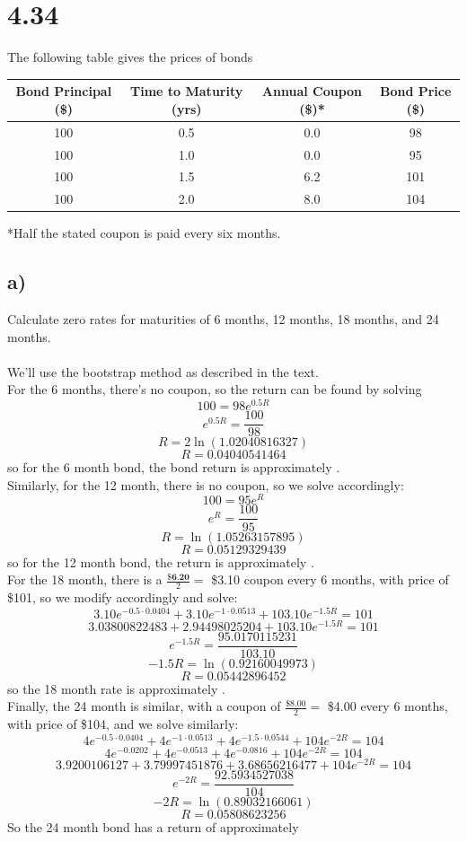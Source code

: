 \documentclass{article}
\begin{document}
{\Large 

\section*{4.34}

The following table gives the prices of bonds
\begin{center}
\begin{tabular}{ |c|c|c|c| } 
 \hline
 Bond Principal (\$) & Time to Maturity (yrs) & Annual Coupon (\$)* & Bond Price (\$) \\ 
 \hline
 100 & 0.5 & 0.0 & 98 \\ 
 \hline
 100 & 1.0 & 0.0 & 95 \\ 
 \hline
 100 & 1.5 & 6.2 & 101 \\ 
 \hline
 100 & 2.0 & 8.0 & 104 \\ 
 \hline
\end{tabular}
\end{center}
*Half the stated coupon is paid every six months.

\subsection*{a)}
Calculate zero rates for maturities of 6 months, 12 months, 18 months, and 24 months. \\ \\
We'll use the bootstrap method as described in the text. \\
For the 6 months, there's no coupon, so the return can be found by solving
\[
  100 = 98e^{0.5R}
\]
\[
  e^{0.5R} = \frac{100}{98}
\]
\[
  R = 2\ln(1.02040816327)
\]
\[
  R = 0.04040541464
\]
so for the 6 month bond, the bond return is approximately . \\ 
Similarly, for the 12 month, there is no coupon, so we solve accordingly:
\[
  100 = 95e^{R}
\]
\[
  e^{R} = \frac{100}{95}
\]
\[
  R = \ln(1.05263157895)
\]
\[
  R = 0.05129329439
\]
so for the 12 month bond, the return is approximately . \\
For the 18 month, there is a \(\frac{\textbf{\$6.20}}{2} = \) \$3.10 coupon every 6 months, with price of \$101, so we modify accordingly and solve:
\[
  3.10e^{-0.5 \cdot 0.0404} + 3.10e^{-1 \cdot 0.0513} + 103.10e^{-1.5R} = 101
\]
\[
  3.03800822483 + 2.94498025204 + 103.10e^{-1.5R} = 101
\]
\[
  e^{-1.5R} = \frac{95.0170115231}{103.10}
\]
\[
  -1.5R = \ln(0.92160049973)
\]
\[
  R = 0.05442896452
\]
so the 18 month rate is approximately . \\
Finally, the 24 month is similar, with a coupon of \(\frac{\text{\$8.00}}{2} = \) \$4.00 every 6 months, with price of \$104, and we solve similarly: 
\[
  4e^{-0.5 \cdot 0.0404} + 4e^{-1 \cdot 0.0513} + 4e^{-1.5 \cdot 0.0544} + 104e^{-2R} = 104
\]
\[
  4e^{-0.0202} + 4e^{-0.0513} + 4e^{-0.0816} + 104e^{-2R} = 104
\]
\[
  3.9200106127 + 3.79997451876 + 3.68656216477 + 104e^{-2R} = 104
\]
\[
  e^{-2R} = \frac{92.5934527038}{104}
\]
\[
  -2R = \ln(0.89032166061)
\]
\[
  R = 0.05808623256
\]
So the 24 month bond has a return of approximately 

}
\end{document}
